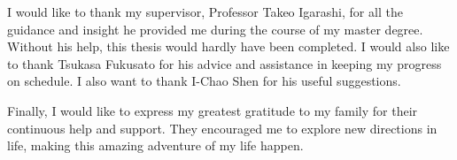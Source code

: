 I would like to thank my supervisor, Professor Takeo Igarashi, for all the guidance and insight he provided me during the course of my master degree. Without his help, this thesis would hardly have been completed. I would also like to thank Tsukasa Fukusato for his advice and assistance in keeping my progress on schedule. I also want to thank I-Chao Shen for his useful suggestions.   


Finally, I would like to express my greatest gratitude to my family for their continuous help and support. They encouraged me to explore new directions in life, making this amazing adventure of my life happen.